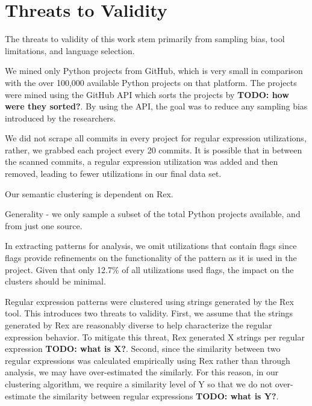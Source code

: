 \documentclass[conference]{IEEEtran}
\newcommand{\todo}[1]{\textbf{TODO: #1}}
\begin{document}










\section{Threats to Validity}

The threats to validity of this work stem primarily from sampling bias, tool limitations, and language selection.

We mined only  Python projects from GitHub, which is very small in comparison with the over 100,000 available Python projects on that platform. The projects were mined using the GitHub API which sorts the projects by \todo{how were they sorted?}. By using the API, the goal was to reduce any sampling bias introduced by the researchers.

We did not scrape all commits in every project for regular expression utilizations, rather, we grabbed each project every 20 commits. It is possible that in between the scanned commits, a regular expression utilization was added and then removed, leading to fewer utilizations in our final data set.

Our semantic clustering is dependent on Rex.

Generality - we only sample a subset of the total Python projects available, and from just one source.

In extracting patterns for analysis, we omit utilizations that contain flags since flags provide refinements on the functionality of the pattern as it is used in the project. Given that only 12.7\% of all utilizations used flags, the impact on the clusters should be minimal.

Regular expression patterns were clustered using strings generated by the Rex tool. This introduces two threats to validity. First, we assume that the strings generated by Rex are reasonably diverse to help characterize the regular expression behavior. To mitigate this threat, Rex generated X strings per regular expression \todo{what is X?}. Second, since the similarity between two regular expressions was calculated empirically using Rex rather than through analysis, we may have over-estimated the similarly. For this reason, in our clustering algorithm, we require a similarity level of Y so that we do not over-estimate the similarity between regular  expressions \todo{what is Y?}.
\end{document}
